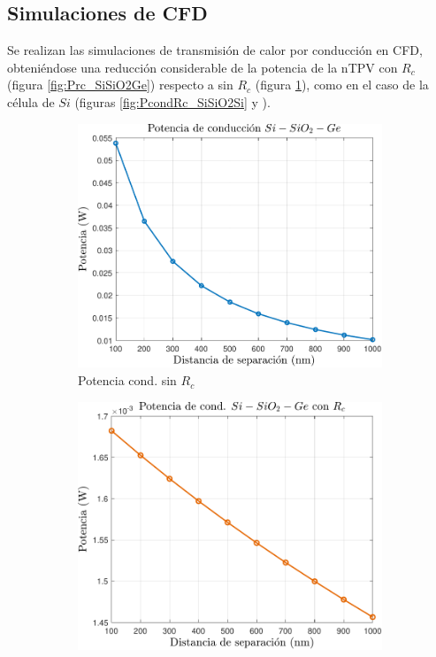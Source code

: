 \subsection{Simulaciones de CFD}
Se realizan las simulaciones de transmisión de calor por conducción en CFD, obteniéndose una reducción considerable de la potencia de la nTPV con $R_c$ (figura \ref{fig:Prc_SiSiO2Ge}) respecto a sin $R_c$ (figura \ref{fig:Pn_SiSiO2Ge}), como en el caso de la célula de $Si$ (figuras \ref{fig:PcondRc_SiSiO2Si}  y ).
\graphicspath{ {./figuras/Resultados/conduccion/pdf/} }
\begin{figure}[H]
	\centering
	\begin{subfigure}[b]{0.49\textwidth}
		\centering
		\includegraphics[width=1\textwidth]{Pn_SiSiO2Ge.pdf}
		\caption{Potencia cond. sin $R_c$}
		\label{fig:Pn_SiSiO2Ge}
	\end{subfigure}
	\hfill
	\begin{subfigure}[b]{0.49\textwidth}
		\centering
		\includegraphics[width=1.00\textwidth]{Prc2_SiSiO2Ge.pdf}

\end{subfigure}
\end{figure}
